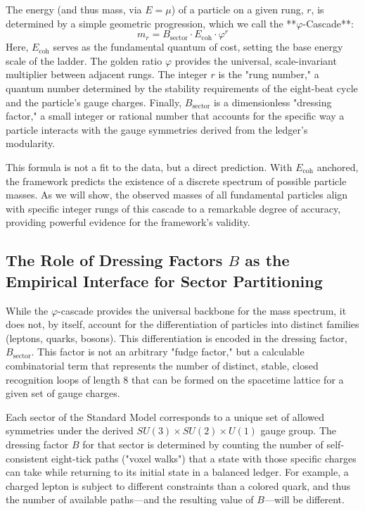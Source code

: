 \documentclass[11pt,a4paper]{article}
\begin{document}
The energy (and thus mass, via \(E=\mu\)) of a particle on a given rung, \(r\), is determined by a simple geometric progression, which we call the **\(\varphi\)-Cascade**:
\begin{equation}
m_r = B_{\text{sector}} \cdot E_{\text{coh}} \cdot \varphi^r
\end{equation}
Here, \(E_{\text{coh}}\) serves as the fundamental quantum of cost, setting the base energy scale of the ladder. The golden ratio \(\varphi\) provides the universal, scale-invariant multiplier between adjacent rungs. The integer \(r\) is the "rung number," a quantum number determined by the stability requirements of the eight-beat cycle and the particle's gauge charges. Finally, \(B_{\text{sector}}\) is a dimensionless "dressing factor," a small integer or rational number that accounts for the specific way a particle interacts with the gauge symmetries derived from the ledger's modularity.

This formula is not a fit to the data, but a direct prediction. With \(E_{\text{coh}}\) anchored, the framework predicts the existence of a discrete spectrum of possible particle masses. As we will show, the observed masses of all fundamental particles align with specific integer rungs of this cascade to a remarkable degree of accuracy, providing powerful evidence for the framework's validity.

\subsection{The Role of Dressing Factors \texorpdfstring{\(B\)}{B} as the Empirical Interface for Sector Partitioning}
While the \(\varphi\)-cascade provides the universal backbone for the mass spectrum, it does not, by itself, account for the differentiation of particles into distinct families (leptons, quarks, bosons). This differentiation is encoded in the dressing factor, \(B_{\text{sector}}\). This factor is not an arbitrary "fudge factor," but a calculable combinatorial term that represents the number of distinct, stable, closed recognition loops of length 8 that can be formed on the spacetime lattice for a given set of gauge charges.

Each sector of the Standard Model corresponds to a unique set of allowed symmetries under the derived \(SU(3) \times SU(2) \times U(1)\) gauge group. The dressing factor \(B\) for that sector is determined by counting the number of self-consistent eight-tick paths ("voxel walks") that a state with those specific charges can take while returning to its initial state in a balanced ledger. For example, a charged lepton is subject to different constraints than a colored quark, and thus the number of available paths—and the resulting value of \(B\)—will be different.
\end{document}
